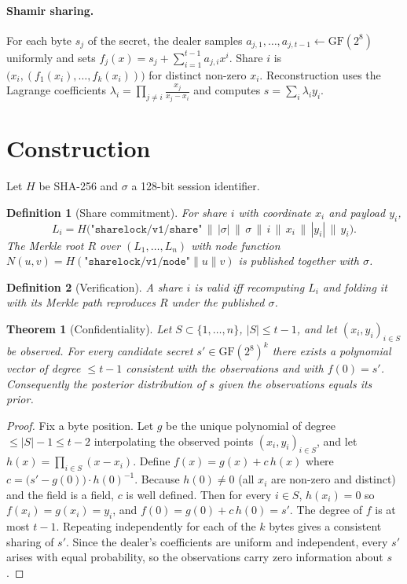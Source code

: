 \documentclass[11pt]{article}
\newtheorem{theorem}{Theorem}
\newtheorem{definition}{Definition}
\begin{document}
\paragraph{Shamir sharing.} For each byte $s_j$ of the secret, the dealer samples
$a_{j,1},\dots,a_{j,t-1} \gets \mathrm{GF}(2^8)$ uniformly and sets
$f_j(x) = s_j + \sum_{i=1}^{t-1} a_{j,i} x^i$. Share $i$ is $\bigl(x_i, (f_1(x_i),\dots,f_k(x_i))\bigr)$
for distinct non-zero $x_i$. Reconstruction uses the Lagrange coefficients
$\lambda_i = \prod_{j \ne i} \frac{x_j}{x_j - x_i}$ and computes $s = \sum_i \lambda_i y_i$.

\section{Construction}
Let $H$ be SHA-256 and $\sigma$ a 128-bit session identifier.

\begin{definition}[Share commitment]
For share $i$ with coordinate $x_i$ and payload $y_i$,
\[
  L_i = H\bigl(\texttt{"sharelock/v1/share"} \,\|\, |\sigma| \,\|\, \sigma \,\|\, i \,\|\, x_i \,\|\, |y_i| \,\|\, y_i\bigr).
\]
The Merkle root $R$ over $(L_1,\dots,L_n)$ with node function
$N(u,v) = H(\texttt{"sharelock/v1/node"} \| u \| v)$ is published together with $\sigma$.
\end{definition}

\begin{definition}[Verification]
A share $i$ is \emph{valid} iff recomputing $L_i$ and folding it with its Merkle path reproduces
$R$ under the published $\sigma$.
\end{definition}

\begin{theorem}[Confidentiality]
Let $S \subset \{1,\dots,n\}$, $|S| \le t-1$, and let $(x_i, y_i)_{i \in S}$ be observed. For every
candidate secret $s' \in \mathrm{GF}(2^8)^k$ there exists a polynomial vector of degree $\le t-1$
consistent with the observations and with $f(0) = s'$. Consequently the posterior distribution of
$s$ given the observations equals its prior.
\end{theorem}
\begin{proof}
Fix a byte position. Let $g$ be the unique polynomial of degree $\le |S|-1 \le t-2$ interpolating
the observed points $(x_i, y_i)_{i \in S}$, and let
$h(x) = \prod_{i \in S} (x - x_i)$. Define $f(x) = g(x) + c\,h(x)$ where
$c = \bigl(s' - g(0)\bigr) \cdot h(0)^{-1}$. Because $h(0) \ne 0$ (all $x_i$ are non-zero and
distinct) and the field is a field, $c$ is well defined. Then for every $i \in S$,
$h(x_i) = 0$ so $f(x_i) = g(x_i) = y_i$, and $f(0) = g(0) + c\,h(0) = s'$. The degree of $f$ is at
most $t-1$. Repeating independently for each of the $k$ bytes gives a consistent sharing of $s'$.
Since the dealer's coefficients are uniform and independent, every $s'$ arises with equal
probability, so the observations carry zero information about $s$.
\end{proof}
\end{document}

